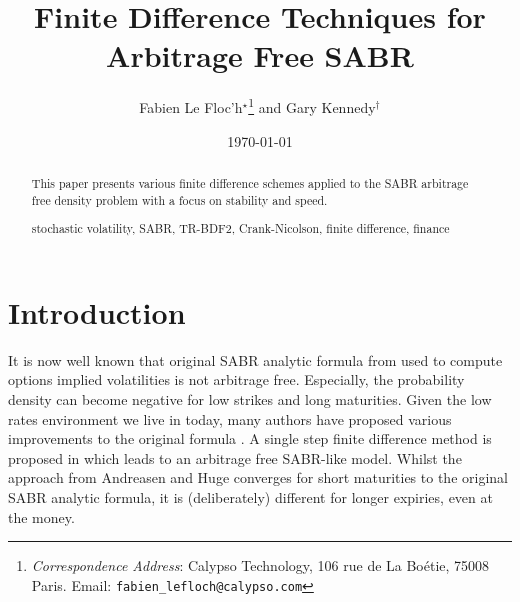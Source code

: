 \documentclass[]{rAMF2e}
\begin{document}
\doi{}
\issn{}  \issnp{}
\def\jobtag{}
\jname{}


\title{Finite Difference Techniques for Arbitrage Free SABR}
\author{Fabien {Le Floc'h}$^\star$\thanks{{\em{Correspondence Address}}: Calypso Technology, 106 rue de La Bo\'{e}tie, 75008 Paris. Email: \texttt{fabien\_lefloch@calypso.com} \vspace{6pt}} and Gary Kennedy$^\dag$}
%
\date{\today}

\maketitle
\newcommand{\sgn}{\mathop{\mathrm{sgn}}}
\begin{abstract}
This paper presents various finite difference schemes applied to the SABR arbitrage free density problem with a focus on stability and speed.
\begin{keywords}stochastic volatility, SABR, TR-BDF2, Crank-Nicolson, finite difference, finance\end{keywords}
\end{abstract}

\section{Introduction}
It is now well known that original SABR analytic formula from \citep{hagan2002managing} used to compute options implied volatilities is not arbitrage free. Especially, the probability density can become negative for low strikes and long maturities. Given the low rates environment we live in today, many authors have proposed various improvements to the original formula \citep{obloj2008fine, johnson2009arbitrage, paulot2009asymptotic, benaim2008arbitrage}.  A single step finite difference method is proposed in \citep{andreasen2011zabr} which leads to an arbitrage free SABR-like model. Whilst the approach from Andreasen and Huge converges for short maturities to the original SABR analytic formula, it is (deliberately) different for longer expiries, even at the money.
\end{document}
